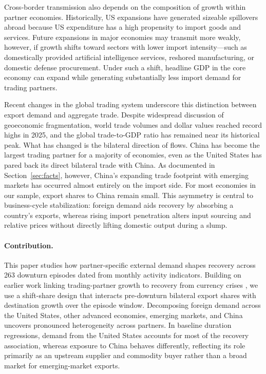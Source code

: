 \documentclass[12pt, a4paper]{article}
\begin{document}
Cross-border transmission also depends on the composition of growth within partner economies. Historically, US expansions have generated sizeable spillovers abroad because US expenditure has a high propensity to import goods and services. Future expansions in major economies may transmit more weakly, however, if growth shifts toward sectors with lower import intensity---such as domestically provided artificial intelligence services, reshored manufacturing, or domestic defense procurement. Under such a shift, headline GDP in the core economy can expand while generating substantially less import demand for trading partners.

Recent changes in the global trading system underscore this distinction between export demand and aggregate trade. Despite widespread discussion of geoeconomic fragmentation, world trade volumes and dollar values reached record highs in 2025, and the global trade-to-GDP ratio has remained near its historical peak. What has changed is the bilateral direction of flows. China has become the largest trading partner for a majority of economies, even as the United States has pared back its direct bilateral trade with China. As documented in Section~\ref{sec:facts}, however, China's expanding trade footprint with emerging markets has occurred almost entirely on the import side. For most economies in our sample, export shares to China remain small. This asymmetry is central to business-cycle stabilization: foreign demand aids recovery by absorbing a country's exports, whereas rising import penetration alters input sourcing and relative prices without directly lifting domestic output during a slump.

\paragraph{Contribution.} This paper studies how partner-specific external demand shapes recovery across 263 downturn episodes dated from monthly activity indicators. Building on earlier work linking trading-partner growth to recovery from currency crises \citep{deb2006}, we use a shift-share design that interacts pre-downturn bilateral export shares with destination growth over the episode window. Decomposing foreign demand across the United States, other advanced economies, emerging markets, and China uncovers pronounced heterogeneity across partners. In baseline duration regressions, demand from the United States accounts for most of the recovery association, whereas exposure to China behaves differently, reflecting its role primarily as an upstream supplier and commodity buyer rather than a broad market for emerging-market exports.
\end{document}

